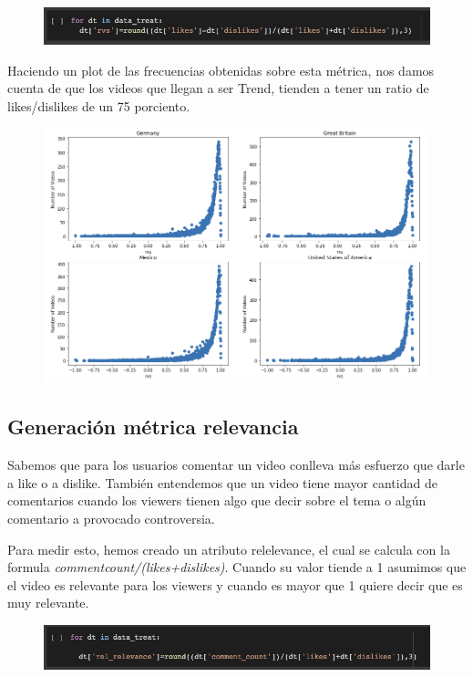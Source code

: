 \documentclass[a4paper,12pt]{article}
\begin{document}
\begin{figure}[h!]
\centering
\includegraphics[width=13cm]{rvs_gen.png}
\end{figure}

Haciendo un plot de las frecuencias obtenidas sobre esta m\'etrica, nos damos cuenta de que los videos que llegan a ser Trend, tienden a tener un ratio de likes/dislikes de un 75 porciento.
\begin{figure}[h!]
\centering
\includegraphics[width=14cm]{rvs_plot.png}
\end{figure}

\subsection{Generaci\'on m\'etrica relevancia}
Sabemos que para los usuarios comentar un video conlleva m\'as esfuerzo que darle a like o a dislike. Tambi\'en entendemos que un video tiene mayor cantidad de comentarios cuando los viewers tienen algo que decir sobre el tema o alg\'un comentario a provocado controversia.

Para medir esto, hemos creado un atributo rel{\textunderscore}elevance, el cual se calcula con la formula {\itshape comment{\textunderscore}count/(likes+dislikes)}. Cuando su valor tiende a 1 asumimos que el video es relevante para los viewers y cuando es mayor que 1 quiere decir que es muy relevante.
\begin{figure}[h!]
\centering
\includegraphics[width=13cm]{rel_gen.png}
\end{figure}
\end{document}

